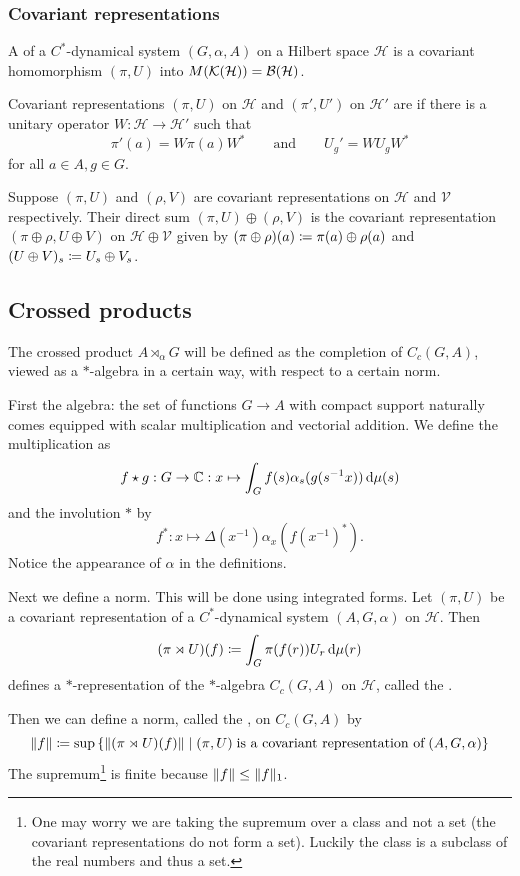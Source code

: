 \subsubsection{Covariant representations}
\begin{definition}
A  of a $C^*$-dynamical system $(G,\alpha, A)$ on a Hilbert space $\mathcal{H}$ is a covariant homomorphism $(\pi, U)$ into $M(\operatorname{\mathcal{K}}(\mathcal{H})) = \operatorname{\mathcal{B}}(\mathcal{H})$.
\end{definition}

\begin{definition}
Covariant representations $(\pi, U)$ on $\mathcal{H}$ and $(\pi', U')$ on $\mathcal{H}'$ are  if there is a unitary operator $W: \mathcal{H}\to \mathcal{H}'$ such that
\[ \pi'(a) = W\pi(a)W^* \qquad \text{and} \qquad U_g' =  WU_gW^* \]
for all $a\in A,g\in G$.
\end{definition}

Suppose $(\pi,U)$ and $(\rho, V)$ are covariant representations on $\mathcal{H}$ and $\mathcal{V}$ respectively. Their direct sum $(\pi, U) \oplus (\rho, V )$ is the covariant representation $(\pi \oplus \rho, U \oplus V )$ on $\mathcal{H} \oplus \mathcal{V}$ given by $(\pi \oplus \rho)(a) \coloneqq \pi(a)\oplus \rho(a)$ and $(U \oplus V)_s \coloneqq U_s \oplus V_s$.
\subsection{Crossed products}
The crossed product $A \rtimes_\alpha G$ will be defined as the completion of $C_c(G,A)$, viewed as a $*$-algebra in a certain way, with respect to a certain norm.

First the algebra: the set of functions $G\to A$ with compact support naturally comes equipped with scalar multiplication and vectorial addition. We define the multiplication as
\[ f\star g: G \to \mathbb{C}: x\mapsto \int_G f(s)\alpha_s(g(s^{-1}x))\operatorname{d \!}\mu(s) \]
and the involution $*$ by
\[ f^*: x\mapsto \Delta(x^{-1})\alpha_x(f(x^{-1})^*). \]
Notice the appearance of $\alpha$ in the definitions.

Next we define a norm. This will be done using integrated forms.
Let $(\pi, U)$ be a covariant representation of a $C^*$-dynamical system $(A,G,\alpha)$ on $\mathcal{H}$. Then
\[ (\pi \rtimes U) (f)  \coloneqq \int_G\pi(f(r))U_r \operatorname{d \!}\mu(r)\]
defines a $*$-representation of the $*$-algebra $C_c(G,A)$ on $\mathcal{H}$, called the .

Then we can define a norm, called the , on $C_c(G,A)$ by
\[ \norm{f} \defeq \sup\setbuilder{\norm{(\pi\rtimes U)(f)}}{(\pi, U)\;\text{is a covariant representation of} \; (A,G,\alpha)} \]
The supremum\footnote{One may worry we are taking the supremum over a class and not a set (the covariant representations do not form a set). Luckily the class is a subclass of the real numbers and thus a set.} is finite because $\lVert f\rVert \leq \lVert f\rVert_1$.

